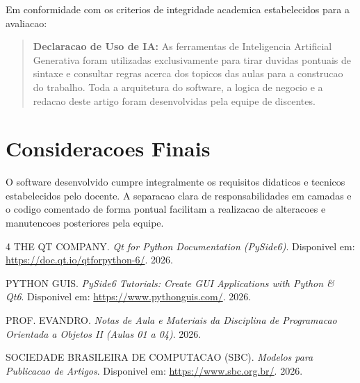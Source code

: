 ﻿\documentclass[12pt]{article}
\begin{document}
Em conformidade com os criterios de integridade academica estabelecidos para a avaliacao:

\begin{quote}
\textbf{Declaracao de Uso de IA:} As ferramentas de Inteligencia Artificial Generativa foram utilizadas exclusivamente para tirar duvidas pontuais de sintaxe e consultar regras acerca dos topicos das aulas para a construcao do trabalho. Toda a arquitetura do software, a logica de negocio e a redacao deste artigo foram desenvolvidas pela equipe de discentes.
\end{quote}

\section{Consideracoes Finais}

O software desenvolvido cumpre integralmente os requisitos didaticos e tecnicos estabelecidos pelo docente. A separacao clara de responsabilidades em camadas e o codigo comentado de forma pontual facilitam a realizacao de alteracoes e manutencoes posteriores pela equipe.

\begin{thebibliography}{4}
THE QT COMPANY. \textit{Qt for Python Documentation (PySide6)}. Disponivel em: \url{https://doc.qt.io/qtforpython-6/}. 2026.

PYTHON GUIS. \textit{PySide6 Tutorials: Create GUI Applications with Python \& Qt6}. Disponivel em: \url{https://www.pythonguis.com/}. 2026.

PROF. EVANDRO. \textit{Notas de Aula e Materiais da Disciplina de Programacao Orientada a Objetos II (Aulas 01 a 04)}. 2026.

SOCIEDADE BRASILEIRA DE COMPUTACAO (SBC). \textit{Modelos para Publicacao de Artigos}. Disponivel em: \url{https://www.sbc.org.br/}. 2026.
\end{thebibliography}
\end{document}
